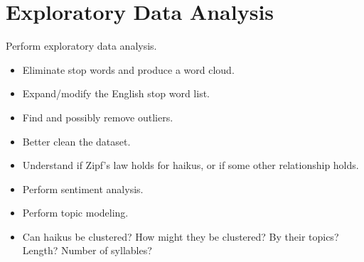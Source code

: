 \section{Exploratory Data Analysis}\label{sec:explore}

{\color{red}
    Perform exploratory data analysis.

    \begin{itemize}
        \item Eliminate stop words and produce a word cloud.
        \item Expand/modify the English stop word list.
        \item Find and possibly remove outliers.
        \item Better clean the dataset.
        \item Understand if Zipf's law holds for haikus, or if some other relationship holds.
        \item Perform sentiment analysis.
        \item Perform topic modeling.
        \item Can haikus be clustered? How might they be clustered? By their topics? Length? Number of syllables?
    \end{itemize}
}
